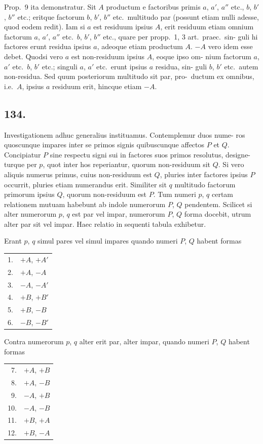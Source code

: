 \documentclass[12pt,a4paper]{article}
\theoremstyle{plain}
\theoremstyle{definition}
\theoremstyle{remark}
\begin{document}
Prop.~9 ita demonstratur. Sit $A$ productum e factoribus primis $a$, $a'$, $a''$
etc., $b$, $b'$, $b''$ etc.; eritque factorum $b$, $b'$, $b''$ etc.\ multitudo par (possunt etiam nulli
adesse, quod eodem redit). Iam si $a$ est residuum ipsius $A$, erit residuum etiam
omnium factorum $a$, $a'$, $a''$ etc.\ $b$, $b'$, $b''$ etc., quare per propp.~1, 3 art.\ praec.\ sin-
guli hi factores erunt residua ipsius $a$, adeoque etiam productum $A$. $-A$ vero
idem esse debet. Quodsi vero $a$ est non-residuum ipsius $A$, eoque ipso om-
nium factorum $a$, $a'$ etc.\ $b$, $b'$ etc.; singuli $a$, $a'$ etc.\ erunt ipsius $a$ residua, sin-
guli $b$, $b'$ etc.\ autem non-residua. Sed quum posteriorum multitudo sit par, pro-\ ductum ex omnibus, i.e.\ $A$, ipsius $a$ residuum erit, hincque etiam $-A$.

\subsection*{134.}

Investigationem adhuc generalius instituamus. Contemplemur duos nume-
ros quoscunque impares inter se primos signis quibuscunque affectos $P$ et $Q$.
Concipiatur $P$ sine respectu signi sui in factores suos primos resolutus, designe-
turque per $p$, quot inter hos reperiantur, quorum non-residuum sit $Q$. Si vero
aliquis numerus primus, cuius non-residuum est $Q$, pluries inter factores ipsius $P$
occurrit, pluries etiam numerandus erit. Similiter sit $q$ multitudo factorum
primorum ipsius $Q$, quorum non-residuum est $P$. Tum numeri $p$, $q$ certam
relationem mutuam habebunt ab indole numerorum $P$, $Q$ pendentem. Scilicet
si alter numerorum $p$, $q$ est par vel impar, numerorum $P$, $Q$ forma docebit,
utrum alter par sit vel impar. Haec relatio in sequenti tabula exhibetur.

Erant $p$, $q$ simul pares vel simul impares quando numeri $P$, $Q$ habent
formas
\begin{center}
\begin{tabular}{rl}
1. & $+A$, $+A'$ \\
2. & $+A$, $-A$ \\
3. & $-A$, $-A'$ \\
4. & $+B$, $+B'$ \\
5. & $+B$, $-B$ \\
6. & $-B$, $-B'$
\end{tabular}
\end{center}

Contra numerorum $p$, $q$ alter erit par, alter impar, quando numeri $P$, $Q$
habent formas
\begin{center}
\begin{tabular}{rl}
7. & $+A$, $+B$ \\
8. & $+A$, $-B$ \\
9. & $-A$, $+B$ \\
10. & $-A$, $-B$ \\
11. & $+B$, $+A$ \\
12. & $+B$, $-A$
\end{tabular}
\end{center}
\end{document}
